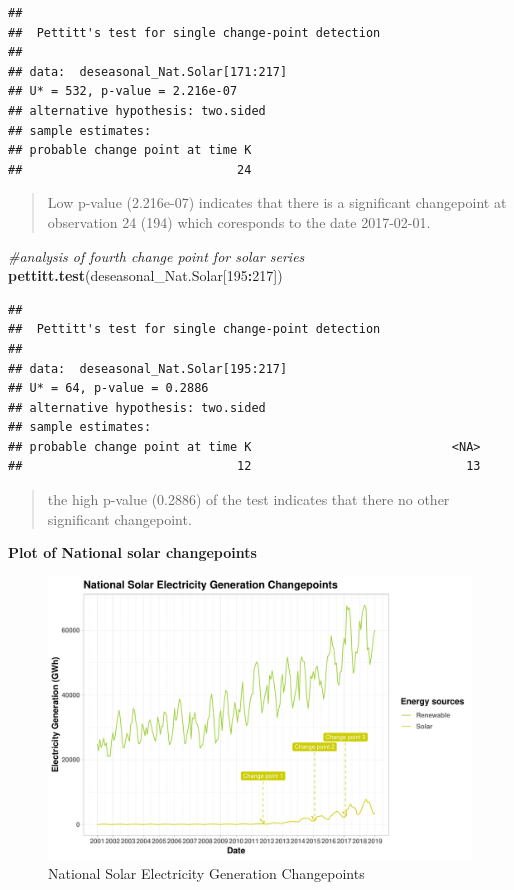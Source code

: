 \documentclass[12pt,]{article}
\newenvironment{Shaded}{\begin{snugshade}}{\end{snugshade}}
\newcommand{\KeywordTok}[1]{\textcolor[rgb]{0.13,0.29,0.53}{\textbf{#1}}}
\newcommand{\DecValTok}[1]{\textcolor[rgb]{0.00,0.00,0.81}{#1}}
\newcommand{\CommentTok}[1]{\textcolor[rgb]{0.56,0.35,0.01}{\textit{#1}}}
\newcommand{\OperatorTok}[1]{\textcolor[rgb]{0.81,0.36,0.00}{\textbf{#1}}}
\newcommand{\NormalTok}[1]{#1}
\begin{document}
\begin{verbatim}
## 
##  Pettitt's test for single change-point detection
## 
## data:  deseasonal_Nat.Solar[171:217]
## U* = 532, p-value = 2.216e-07
## alternative hypothesis: two.sided
## sample estimates:
## probable change point at time K 
##                              24
\end{verbatim}

\begin{quote}
Low p-value (2.216e-07) indicates that there is a significant
changepoint at observation 24 (194) which coresponds to the date
2017-02-01.
\end{quote}

\begin{Shaded}
\begin{Highlighting}[]
\CommentTok{#analysis of fourth change point for solar series}
\KeywordTok{pettitt.test}\NormalTok{(deseasonal_Nat.Solar[}\DecValTok{195}\OperatorTok{:}\DecValTok{217}\NormalTok{])}
\end{Highlighting}
\end{Shaded}

\begin{verbatim}
## 
##  Pettitt's test for single change-point detection
## 
## data:  deseasonal_Nat.Solar[195:217]
## U* = 64, p-value = 0.2886
## alternative hypothesis: two.sided
## sample estimates:
## probable change point at time K                            <NA> 
##                              12                              13
\end{verbatim}

\begin{quote}
the high p-value (0.2886) of the test indicates that there no other
significant changepoint.
\end{quote}

\textbf{Plot of National solar changepoints}

\begin{figure}
\centering
\includegraphics{Kara_ENV872_Project_files/figure-latex/unnamed-chunk-29-1.pdf}
\caption{National Solar Electricity Generation Changepoints}
\end{figure}
\end{document}
